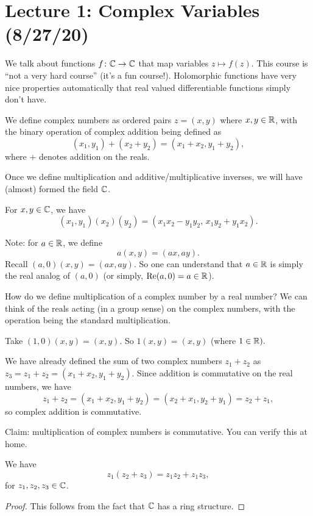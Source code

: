 \section{Lecture 1: Complex Variables (8/27/20)}
We talk about functions $ f \colon \mathbb{C} \to \mathbb{C}$ that map variables $z \mapsto f(z)$. This course is ``not a very hard course'' (it's a fun course!). Holomorphic functions have very nice properties automatically that real valued differentiable functions simply don't have.
\begin{definition}
    We define complex numbers as ordered pairs $z=(x,y)$ where $x,y \in \mathbb{R}$, with the binary operation of complex addition being defined as \[
        (x_1,y_1)+(x_2+y_2)=(x_1+x_2,y_1+y_2),
    \]
   where $+$ denotes addition on the reals. 
\end{definition}
Once we define multiplication and additive/multiplicative inverses, we will have (almost) formed the field $\mathbb{C}$. 
\begin{definition}
    For $x,y \in \mathbb{C}$, we have 
    \[
    (x_1,y_1)(x_2)(y_2)=(x_1x_2-y_1y_2,\,x_1y_2+y_1x_2).
    \]
\end{definition}
Note: for $a \in \mathbb{R}$, we define \[
    a(x,y)=(ax,ay).
\]
Recall $(a,0)(x,y)=(ax,ay).$ So one can understand that $a\in\mathbb{R}$ is simply the real analog of $(a,0)$ (or simply, $\operatorname{Re}(a,0)=a \in \mathbb{R}$).

How do we define multiplication of a complex number by a real number? We can think of the reals acting (in a group sense) on the complex numbers, with the operation being the standard multiplication.

\begin{example}
    Take $(1,0)(x,y)=(x,y).$ So $1(x,y)=(x,y)$ (where $1 \in \mathbb{R}).$
\end{example}

\begin{example}
    
We have already defined the sum of two complex numbers $z_1+z_2$ as $z_3=z_1+z_2=(x_1+x_2,y_1+y_2).$ Since addition is commutative on the real numbers, we have  \[
  z_1+z_2=(x_1+x_2,y_1+y_2)=(x_2+x_1,y_2+y_1)=z_2+z_1,
\]
so complex addition is commutative.
\end{example}

Claim: multiplication of complex numbers is commutative. You can verify this at home.

\begin{theorem}
   We have \[
       z_1(z_2+z_3)=z_1z_2+z_1z_3,
   \]
   for $z_1,z_2,z_3 \in \mathbb{C}$. 
\end{theorem}
\begin{proof}
    This follows from the fact that $\mathbb{C}$ has a ring structure.
\end{proof}

